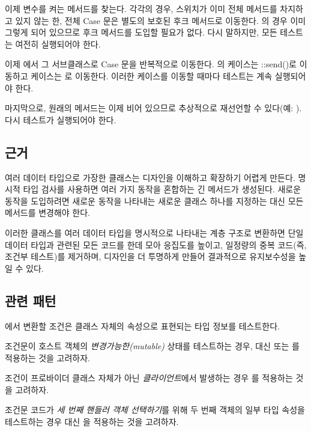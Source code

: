 \documentclass[a4paper,10pt,twoside]{book}
\begin{document}
이제  변수를 켜는 메서드를 찾는다. 각각의 경우, 스위치가 이미 전체 메서드를 차지하고 있지 않는 한, 전체 Case 문은 별도의 보호된 후크 메서드로 이동한다. 의 경우 이미 그렇게 되어 있으므로 후크 메서드를 도입할 필요가 없다. 다시 말하지만, 모든 테스트는 여전히 실행되어야 한다.

이제 에서 그 서브클래스로 Case 문을 반복적으로 이동한다. 의  케이스는 ::send()로 이동하고  케이스는 로 이동한다. 이러한 케이스를 이동할 때마다 테스트는 계속 실행되어야 한다.

마지막으로, 원래의  메서드는 이제 비어 있으므로 추상적으로 재선언할 수 있다(예: ). 다시 테스트가 실행되어야 한다. 

\subsection*{근거}

여러 데이터 타입으로 가장한 클래스는 디자인을 이해하고 확장하기 어렵게 만든다. 명시적 타입 검사를 사용하면 여러 가지 동작을 혼합하는 긴 메서드가 생성된다. 새로운 동작을 도입하려면 새로운 동작을 나타내는 새로운 클래스 하나를 지정하는 대신 모든 메서드를 변경해야 한다.

이러한 클래스를 여러 데이터 타입을 명시적으로 나타내는 계층 구조로 변환하면 단일 데이터 타입과 관련된 모든 코드를 한데 모아 응집도를 높이고, 일정량의 중복 코드(즉, 조건부 테스트)를 제거하며, 디자인을 더 투명하게 만들어 결과적으로 유지보수성을 높일 수 있다.

\subsection*{관련 패턴}

에서 변환할 조건은 클래스 자체의 속성으로 표현되는 타입 정보를 테스트한다.

조건문이 호스트 객체의 \emph{변경가능한(mutable)} 상태를 테스트하는 경우, 대신  또는 를 적용하는 것을 고려하자.

조건이 프로바이더 클래스 자체가 아닌 \emph{클라이언트}에서 발생하는 경우 를 적용하는 것을 고려하자.

조건문 코드가 \emph{세 번째 핸들러 객체 선택하기}를 위해 두 번째 객체의 일부 타입 속성을 테스트하는 경우 대신 을 적용하는 것을 고려하자. 
\end{document}
